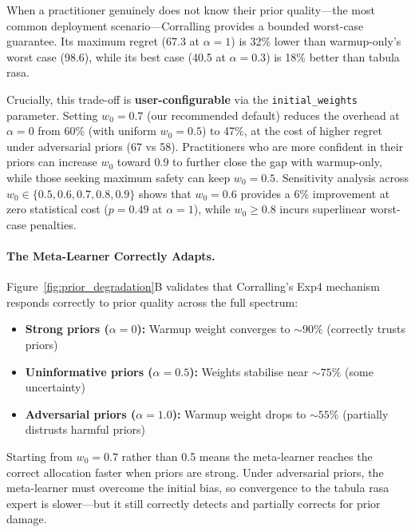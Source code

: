 When a practitioner genuinely does not know their prior quality---the
most common deployment scenario---Corralling provides a bounded
worst-case guarantee.  Its maximum regret (67.3 at $\alpha{=}1$) is
32\% lower than warmup-only's worst case (98.6), while its best case
(40.5 at $\alpha{=}0.3$) is 18\% better than tabula rasa.

Crucially, this trade-off is \textbf{user-configurable} via the
\texttt{initial\_weights} parameter.
Setting $w_0{=}0.7$ (our recommended default) reduces the overhead at
$\alpha{=}0$ from 60\% (with uniform $w_0{=}0.5$) to 47\%, at the
cost of higher regret under adversarial priors (67 vs 58).
Practitioners who are more confident in their priors can increase
$w_0$ toward 0.9 to further close the gap with warmup-only, while
those seeking maximum safety can keep $w_0{=}0.5$.
Sensitivity analysis across $w_0 \in \{0.5, 0.6, 0.7, 0.8, 0.9\}$
shows that $w_0{=}0.6$ provides a 6\% improvement at zero statistical
cost ($p{=}0.49$ at $\alpha{=}1$), while $w_0 \geq 0.8$ incurs
superlinear worst-case penalties.

\paragraph{The Meta-Learner Correctly Adapts.}
Figure~\ref{fig:prior_degradation}B validates that Corralling's Exp4
mechanism responds correctly to prior quality across the full spectrum:

\begin{itemize}[nosep]
    \item \textbf{Strong priors ($\alpha{=}0$):} Warmup weight converges
          to ${\sim}90\%$ (correctly trusts priors)
    \item \textbf{Uninformative priors ($\alpha{=}0.5$):} Weights
          stabilise near ${\sim}75\%$ (some uncertainty)
    \item \textbf{Adversarial priors ($\alpha{=}1.0$):} Warmup weight
          drops to ${\sim}55\%$ (partially distrusts harmful priors)
\end{itemize}

Starting from $w_0{=}0.7$ rather than 0.5 means the meta-learner
reaches the correct allocation faster when priors are strong.
Under adversarial priors, the meta-learner must overcome the initial
bias, so convergence to the tabula rasa expert is slower---but it
still correctly detects and partially corrects for prior damage.

